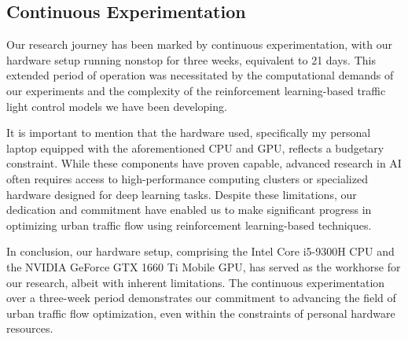 \subsection{Continuous Experimentation}

Our research journey has been marked by continuous experimentation, with our hardware setup running nonstop for three weeks, equivalent to 21 days. This extended period of operation was necessitated by the computational demands of our experiments and the complexity of the reinforcement learning-based traffic light control models we have been developing. 

It is important to mention that the hardware used, specifically my personal laptop equipped with the aforementioned CPU and GPU, reflects a budgetary constraint. While these components have proven capable, advanced research in AI often requires access to high-performance computing clusters or specialized hardware designed for deep learning tasks. Despite these limitations, our dedication and commitment have enabled us to make significant progress in optimizing urban traffic flow using reinforcement learning-based techniques.

In conclusion, our hardware setup, comprising the Intel Core i5-9300H CPU and the NVIDIA GeForce GTX 1660 Ti Mobile GPU, has served as the workhorse for our research, albeit with inherent limitations. The continuous experimentation over a three-week period demonstrates our commitment to advancing the field of urban traffic flow optimization, even within the constraints of personal hardware resources.
